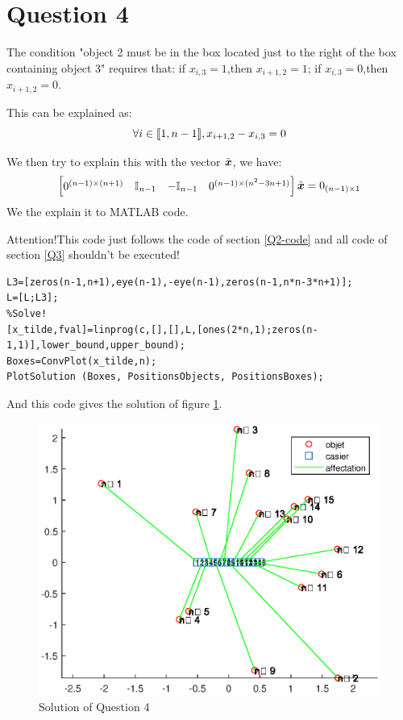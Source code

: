 \documentclass{CSArticle}[english]
\def\xtd{\tilde{\xbs}}
\begin{document}
\section{Question 4}
\label{Q4}
The condition "object
2 must be in the box located just to the right of the box containing object 3" requires that:
if $x_{i,3}=1$,then $x_{i+1,2}=1$; if $x_{i,3}=0$,then $x_{i+1,2}=0$.\par
This can be explained as:
\begin{equation}
    \forall i\in \llbracket1,n-1\rrbracket, x_{i+1,2}-x_{i,3}=0
\end{equation}\par
We then try to explain this with the vector $\xtd$, we have:
\begin{equation}
    \left[\begin{matrix}
0^{(n-1)\times(n+1)}&\Ibb_{n-1}&-\Ibb_{n-1}&0^{(n-1)\times(n^2-3n+1)}
\end{matrix}\right]\xtd=0_{(n-1)\times 1}
\end{equation}
We the explain it to MATLAB code. 
\par {\color{red}Attention!This code just follows the code of section \ref{Q2-code} and all code of section \ref{Q3} shouldn't be executed!}
\begin{lstlisting}[style=MATLAB]
%Definition of L3
L3=[zeros(n-1,n+1),eye(n-1),-eye(n-1),zeros(n-1,n*n-3*n+1)];
L=[L;L3];
%Solve!
[x_tilde,fval]=linprog(c,[],[],L,[ones(2*n,1);zeros(n-1,1)],lower_bound,upper_bound);
Boxes=ConvPlot(x_tilde,n);
PlotSolution (Boxes, PositionsObjects, PositionsBoxes);
\end{lstlisting}
And this code gives the solution of figure \ref{fig:Q4}.
\begin{figure}[ht]
\centering
\includegraphics[scale=0.6]{figure/Q4.eps}
\caption{Solution of Question 4}
\label{fig:Q4}
\end{figure}
\end{document}
